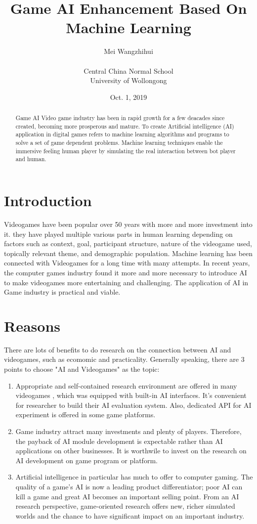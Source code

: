 \documentclass{article}
\title{Game AI Enhancement Based On Machine Learning}
\author{ Mei Wangzhihui \\ \\
Central China Normal School\\
University of Wollongong
\\
}
\date{Oct. 1, 2019}
\begin{document}
\maketitle

\begin{abstract}
    Game AI
    Video game industry has been in rapid growth for a few deacades since created, becoming more prosperous and mature. To create
    Artificial intelligence (AI) application in digital games refers to machine learning algorithms and programs to solve a set of game dependent problems. Machine learning techniques enable the immersive feeling human player by simulating the real interaction between bot player and human.\cite{1}
\end{abstract}

\section{Introduction}
Videogames have been popular over 50 years with more and more investment into it. they have played multiple various parts in human learning depending on factors such as context, goal, participant structure, nature of the videogame used, topically relevant theme, and demographic population. \cite{2} Machine learning has been connected with Videogames for a long time with many attempts. \cite{3} In recent years, the computer games industry found it more and more necessary to introduce AI to make videogames more entertaining and challenging. \cite{4,5} The application of AI in Game industry is practical and viable. \cite{6}



\section{Reasons}
There are lots of benefits to do research on the connection between AI and videogames, such as ecomomic and practicality. \cite{7} Generally speaking, there are 3 points to choose "AI and Videogames" as the topic:
\begin{enumerate}
    \item Appropriate and self-contained research environment are offered in many videogames \cite{8}, which was equipped with built-in AI interfaces. It's convenient for researcher to build their AI evaluation system. Also, dedicated API for AI experiment is offered in some game platforms. \cite{9}
    \item Game industry attract many investments and plenty of players. Therefore, the payback of AI module development is expectable rather than AI applications on other businesses.\cite{8} It is worthwile to invest on the research on AI development on game program or platform.
    \item Artificial intelligence in particular has much to offer to computer gaming. The quality of a game’s AI is now a leading product differentiator; poor AI can kill a game and great AI becomes an important selling point. From an AI research perspective, game-oriented research offers new, richer simulated worlds and the chance to have significant impact on an important industry. \cite{5}
\end{enumerate}
\end{document}
